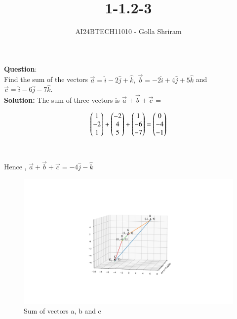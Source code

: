 \documentclass[journal]{IEEEtran}
\begin{document}

\vspace{3cm}

\title{1-1.2-3}
\author{AI24BTECH11010  - Golla Shriram
}
{\let\newpage\relax\maketitle}

\renewcommand{\thefigure}{\theenumi}
\renewcommand{\thetable}{\theenumi}
\setlength{\intextsep}{10pt} %


\renewcommand{\thetable}{\theenumi}


\textbf{Question}:\\
     Find the sum of the vectors $\vec{a} = \hat{i}-2\hat{j}+\hat{k} ,\ \vec{b} = -2\hat{i}+4\hat{j}+5\hat{k}$  and  $ \vec{c} = \hat{i}-6\hat{j}-7\hat{k}. $
\\
\textbf{Solution: }
  The sum of three vectors is $\vec{a} + \vec{b} + \vec{c}$  =

\begin{align}
	\begin{pmatrix}
    1   \\
   -2 \\
	 1\end{pmatrix}
+  \begin{pmatrix}
    -2    \\
    4\\
  5\end{pmatrix}+ \begin{pmatrix}
     1
   \\
  -6
   \\
    -7\end{pmatrix}
   = \begin{pmatrix}
    0 \\
    -4	\\-1\end{pmatrix}
\end{align}\\ \\
  Hence , $ \vec{a}   +   \vec{b}+   \vec{c} =  -4\hat{j}-\hat{k}  $



  \begin{figure}[h!]
   \centering
   \includegraphics[width=0.6\linewidth]{figs/image.png}
	  \caption{ Sum of vectors a, b and c }
   \label{stemplot}
\end{figure}
\end{document}
